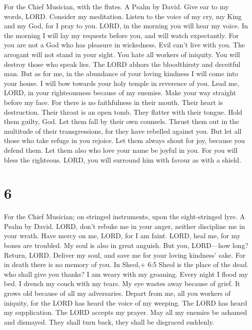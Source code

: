 For the Chief Musician, with the flutes. A Psalm by David. 
Give ear to my words, LORD. Consider my meditation.  Listen
to the voice of my cry, my King and my God, for I pray to you.
 LORD, in the morning you will hear my voice. In the morning
I will lay my requests before you, and will watch expectantly.
 For you are not a God who has pleasure in wickedness. Evil
can't live with you.  The arrogant will not stand in your
sight. You hate all workers of iniquity.  You will destroy
those who speak lies. The LORD abhors the bloodthirsty and deceitful
man.  But as for me, in the abundance of your loving
kindness I will come into your house. I will bow towards your holy
temple in reverence of you.  Lead me, LORD, in your
righteousness because of my enemies. Make your way straight before my
face.  For there is no faithfulness in their mouth. Their
heart is destruction. Their throat is an open tomb. They flatter with
their tongue.  Hold them guilty, God. Let them fall by
their own counsels. Thrust them out in the multitude of their
transgressions, for they have rebelled against you.  But
let all those who take refuge in you rejoice. Let them always shout for
joy, because you defend them. Let them also who love your name be joyful
in you.  For you will bless the righteous. LORD, you will
surround him with favour as with a shield.

\hypertarget{section-5}{%
\section{6}\label{section-5}}

For the Chief Musician; on stringed instruments, upon the eight-stringed
lyre. A Psalm by David.  LORD, don't rebuke me in your
anger, neither discipline me in your wrath.  Have mercy on
me, LORD, for I am faint. LORD, heal me, for my bones are troubled.
 My soul is also in great anguish. But you, LORD---how long?
 Return, LORD. Deliver my soul, and save me for your loving
kindness' sake.  For in death there is no memory of you. In
Sheol,+ 6:5 Sheol is the place of the dead. who shall give you thanks?
 I am weary with my groaning. Every night I flood my bed. I
drench my couch with my tears.  My eye wastes away because
of grief. It grows old because of all my adversaries. 
Depart from me, all you workers of iniquity, for the LORD has heard the
voice of my weeping.  The LORD has heard my supplication.
The LORD accepts my prayer.  May all my enemies be ashamed
and dismayed. They shall turn back, they shall be disgraced suddenly.

